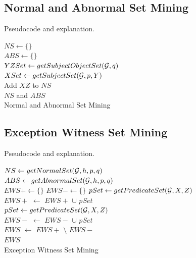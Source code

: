 \subsection{Normal and Abnormal Set Mining}

Pseudocode and explanation.

\IncMargin{1.5em}
\begin{algorithm}[H]
\DontPrintSemicolon
\SetAlgoLined
{}
\BlankLine
$NS \leftarrow \{\}$\\
$ABS \leftarrow \{\}$\\
$YZSet \leftarrow getSubjectObjectSet(\mathcal{G}, q)$\\
\BlankLine
{} {
    \BlankLine
	$XSet \leftarrow getSubjectSet(\mathcal{G}, p, Y)$\\
	 {
	 {
		Add $XZ$ to $NS$\\
	}
	}
}
\BlankLine
\Return $NS$ and $ABS$\\
\caption{Normal and Abnormal Set Mining}
\end{algorithm}
\DecMargin{1.5em}

\subsection{Exception Witness Set Mining}

Pseudocode and explanation.

\IncMargin{1.5em}
\begin{algorithm}[H]
\DontPrintSemicolon
\SetAlgoLined
{}
\BlankLine
$NS \leftarrow getNormalSet(\mathcal{G}, h, p, q)$\\
$ABS \leftarrow getAbnormalSet(\mathcal{G}, h, p, q)$\\
$EWS+ \leftarrow \{\}$
$EWS- \leftarrow \{\}$
\BlankLine
{} {
	$pSet \leftarrow getPredicateSet(\mathcal{G}, X, Z)$\\
	$EWS+$ $\leftarrow$ $EWS+$ $\cup$ $pSet$\\
}
 {
	$pSet \leftarrow getPredicateSet(\mathcal{G}, X, Z)$\\
	$EWS-$ $\leftarrow$ $EWS-$ $\cup$ $pSet$\\
}
$EWS$ $\leftarrow$ $EWS+$ $\setminus$ $EWS-$\\
\Return $EWS$\\
\caption{Exception Witness Set Mining}
\end{algorithm}
\DecMargin{1.5em}

